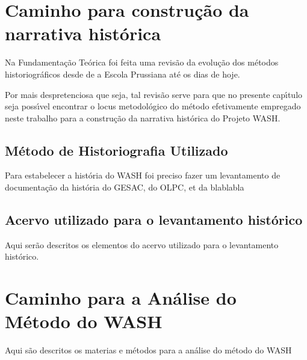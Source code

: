 \documentclass[
12pt,		%
openright,	%
twoside,  %
a4paper,			%
chapter=TITLE,		%
english,			%
french,				%
spanish,			%
brazil				%
]{USPSC-classe/USPSC_RedarTex}
\begin{document}
\section[Caminho para constru\c{c}\~ao da narrativa hist\'orica]{Caminho para constru\c{c}\~ao da narrativa hist\'orica}\label{Caminho para constru\c{c}\~ao da narrativa hist\'orica}
Na Fundamenta\c{c}\~ao Te\'orica foi feita uma revis\~ao da evolu\c{c}\~ao dos m\'etodos historiogr\'aficos desde de a Escola Prussiana at\'e os dias de hoje.








Por mais despretenciosa que seja, tal revis\~ao serve para que no presente cap\'{\i}tulo seja poss\'{\i}vel encontrar o locus metodol\'ogico do m\'etodo efetivamente empregado neste trabalho para a constru\c{c}\~ao da narrativa hist\'orica do Projeto WASH.








\subsection[M\'etodo de Historiografia Utilizado ]{M\'etodo de Historiografia Utilizado }\label{M\'etodo de Historiografia Utilizado }
Para estabelecer a hist\'oria do WASH foi preciso fazer um levantamento de documenta\c{c}\~ao da hist\'oria do GESAC, do OLPC, et da blablabla








\subsection[Acervo utilizado para o levantamento hist\'orico]{Acervo utilizado para o levantamento hist\'orico}\label{Acervo utilizado para o levantamento hist\'orico}
Aqui ser\~ao descritos os elementos do acervo utilizado para o levantamento hist\'orico.








\section[Caminho para a An\'alise do M\'etodo do WASH]{Caminho para a An\'alise do M\'etodo do WASH}\label{Caminho para a An\'alise do M\'etodo do WASH}
Aqui s\~ao descritos os materias e m\'etodos para a an\'alise do m\'etodo do WASH
\end{document}
